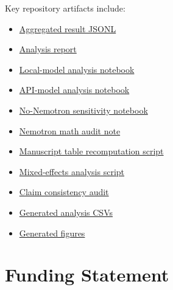 \documentclass{llncs}
\providecommand{\tightlist}{%
  \setlength{\itemsep}{0pt}\setlength{\parskip}{0pt}}
\begin{document}
Key repository artifacts include:

\begin{itemize}
\tightlist
\item
  \href{https://github.com/tycoi2005/prompt-framing-experiment/blob/main/02ScalingPhrase/results_analysis/prompt_framing_experiment_results.jsonl}{Aggregated
  result JSONL}
\item
  \href{https://github.com/tycoi2005/prompt-framing-experiment/blob/main/02ScalingPhrase/results_analysis/report.md}{Analysis report}
\item
  \href{https://github.com/tycoi2005/prompt-framing-experiment/blob/main/02ScalingPhrase/results_analysis/notebooks/smallmodels_analysis.executed.ipynb}{Local-model
  analysis notebook}
\item
  \href{https://github.com/tycoi2005/prompt-framing-experiment/blob/main/02ScalingPhrase/results_analysis/notebooks/apimodels_analysis.executed.ipynb}{API-model
  analysis notebook}
\item
  \href{https://github.com/tycoi2005/prompt-framing-experiment/blob/main/02ScalingPhrase/results_analysis/notebooks/smallmodels_without_nemotron_analysis.executed.ipynb}{No-Nemotron
  sensitivity notebook}
\item
  \href{https://github.com/tycoi2005/prompt-framing-experiment/blob/main/10Paperv3/nemotron_math_audit.md}{Nemotron math audit note}
\item
  \href{https://github.com/tycoi2005/prompt-framing-experiment/blob/main/10Paperv3/scripts/recompute_manuscript_tables.py}{Manuscript table
  recomputation script}
\item
  \href{https://github.com/tycoi2005/prompt-framing-experiment/blob/main/10Paperv3/scripts/run_mixed_effects_analysis.py}{Mixed-effects
  analysis script}
\item
  \href{https://github.com/tycoi2005/prompt-framing-experiment/blob/main/10Paperv3/claim_consistency_audit.md}{Claim consistency
  audit}
\item
  \href{https://github.com/tycoi2005/prompt-framing-experiment/tree/main/10Paperv3/analysis}{Generated
  analysis CSVs}
\item
  \href{https://github.com/tycoi2005/prompt-framing-experiment/tree/main/10Paperv3/figures}{Generated figures}
\end{itemize}

\section{Funding Statement}\label{funding-statement}
\end{document}
